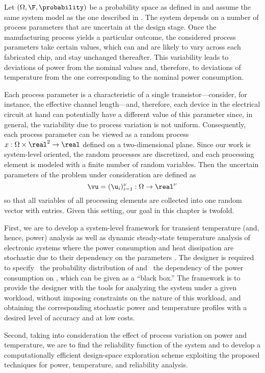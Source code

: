 Let $(\Omega, \F, \probability)$ be a probability space as defined in
 and assume the same system model as the one described
in . The system depends on a number of process parameters
that are uncertain at the design stage. Once the manufacturing process yields a
particular outcome, the considered process parameters take certain values, which
can and are likely to vary across each fabricated chip, and stay unchanged
thereafter. This variability leads to deviations of power from the nominal
values and, therefore, to deviations of temperature from the one corresponding
to the nominal power consumption.

Each process parameter is a characteristic of a single transistor---consider,
for instance, the effective channel length---and, therefore, each device in the
electrical circuit at hand can potentially have a different value of this
parameter since, in general, the variability due to process variation is not
uniform. Consequently, each process parameter can be viewed as a random process
$x: \Omega \times \real^2 \to \real$ defined on a two-dimensional plane. Since
our work is system-level oriented, the random processes are discretized, and
each processing element is modeled with a finite number of random variables.
Then the uncertain parameters of the problem under consideration are defined as
\[
  \vu = (\u_i)_{i = 1}^\nu: \Omega \to \real^\nu
\]
so that all variables of all processing elements are collected into one random
vector with \nu entries. Given this setting, our goal in this chapter is
twofold.

First, we are to develop a system-level framework for transient temperature
(and, hence, power) analysis as well as dynamic steady-state temperature
analysis of electronic systems where the power consumption and heat dissipation
are stochastic due to their dependency on the parameters \vu. The designer is
required to specify \one~the probability distribution of \vu and \two~the
dependency of the power consumption on \vu, which can be given as a ``black
box.'' The framework is to provide the designer with the tools for analyzing the
system under a given workload, without imposing constraints on the nature of
this workload, and obtaining the corresponding stochastic power \mp and
temperature \mq profiles with a desired level of accuracy and at low costs.

Second, taking into consideration the effect of process variation on power and
temperature, we are to find the reliability function of the system and to
develop a computationally efficient design-space exploration scheme exploiting
the proposed techniques for power, temperature, and reliability analysis.
